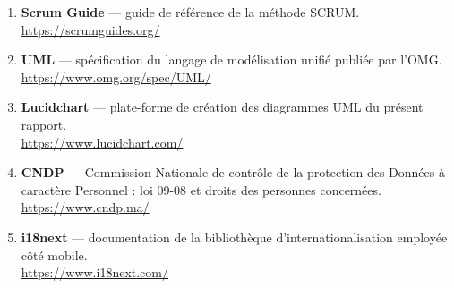 \begin{enumerate}[leftmargin=1.1cm,itemsep=6pt]
  \item \textbf{Scrum Guide} --- guide de référence de la méthode SCRUM.
  \\ \url{https://scrumguides.org/}

  \item \textbf{UML} --- spécification du langage de modélisation unifié
  publiée par l'OMG.
  \\ \url{https://www.omg.org/spec/UML/}

  \item \textbf{Lucidchart} --- plate-forme de création des diagrammes UML du
  présent rapport.
  \\ \url{https://www.lucidchart.com/}

  \item \textbf{CNDP} --- Commission Nationale de contrôle de la protection des
  Données à caractère Personnel : loi 09-08 et droits des personnes concernées.
  \\ \url{https://www.cndp.ma/}

  \item \textbf{i18next} --- documentation de la bibliothèque
  d'internationalisation employée côté mobile.
  \\ \url{https://www.i18next.com/}

\end{enumerate}
